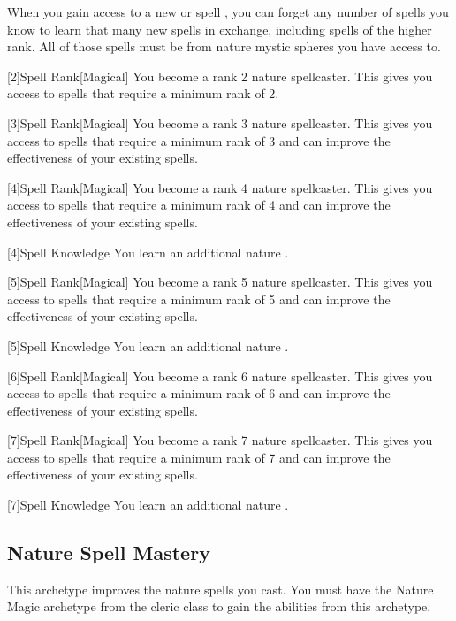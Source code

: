         When you gain access to a new  or spell ,
            you can forget any number of spells you know to learn that many new spells in exchange,
            including spells of the higher rank.
        All of those spells must be from nature mystic spheres you have access to.

        [2]{Spell Rank}[Magical] You become a rank 2 nature spellcaster.
        This gives you access to spells that require a minimum rank of 2.

        [3]{Spell Rank}[Magical] You become a rank 3 nature spellcaster.
        This gives you access to spells that require a minimum rank of 3 and can improve the effectiveness of your existing spells.

        [4]{Spell Rank}[Magical] You become a rank 4 nature spellcaster.
        This gives you access to spells that require a minimum rank of 4 and can improve the effectiveness of your existing spells.

        [4]{Spell Knowledge} You learn an additional nature .

        [5]{Spell Rank}[Magical] You become a rank 5 nature spellcaster.
        This gives you access to spells that require a minimum rank of 5 and can improve the effectiveness of your existing spells.

        [5]{Spell Knowledge} You learn an additional nature .

        [6]{Spell Rank}[Magical] You become a rank 6 nature spellcaster.
        This gives you access to spells that require a minimum rank of 6 and can improve the effectiveness of your existing spells.

        [7]{Spell Rank}[Magical] You become a rank 7 nature spellcaster.
        This gives you access to spells that require a minimum rank of 7 and can improve the effectiveness of your existing spells.

        [7]{Spell Knowledge} You learn an additional nature .

    \newpage
    \subsection{Nature Spell Mastery}
        This archetype improves the nature spells you cast.
        You must have the Nature Magic archetype from the cleric class to gain the abilities from this archetype.

